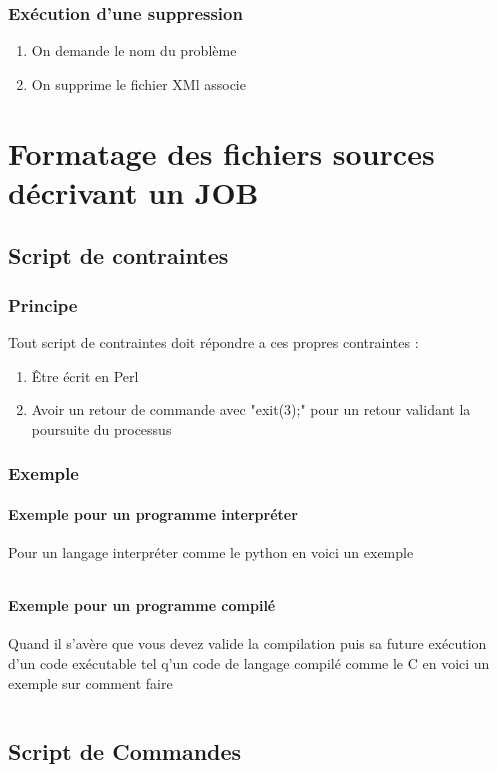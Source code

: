 \documentclass[11pt]{report}
\begin{document}
\newpage\subsection{Exécution d'une suppression}
\begin{enumerate}
\item On demande le nom du problème 
\item On supprime le fichier XMl associe 
\end{enumerate}

\chapter{Formatage des fichiers sources décrivant un JOB}
\section{Script de contraintes}
\subsection{Principe}
Tout script de contraintes doit répondre a ces propres contraintes :
\begin{enumerate}
\item Être écrit en Perl
\item Avoir un retour de commande avec "exit(3);" pour un retour validant la poursuite du processus 

\end{enumerate}
\subsection{Exemple}
\subsubsection{Exemple pour un programme interpréter}
Pour un langage interpréter comme le python en voici un exemple
\inputminted{perl}{../Echantillon_Script_Perl/nqueen.pl}
\subsubsection{Exemple pour un programme compilé }
Quand il s’avère que vous devez valide la compilation puis sa future exécution d'un code exécutable tel q'un code de langage compilé comme le C en voici un exemple sur comment faire 
\inputminted{perl}{../Echantillon_Script_Perl/langford.pl}
\section{Script de Commandes}
\end{document}
